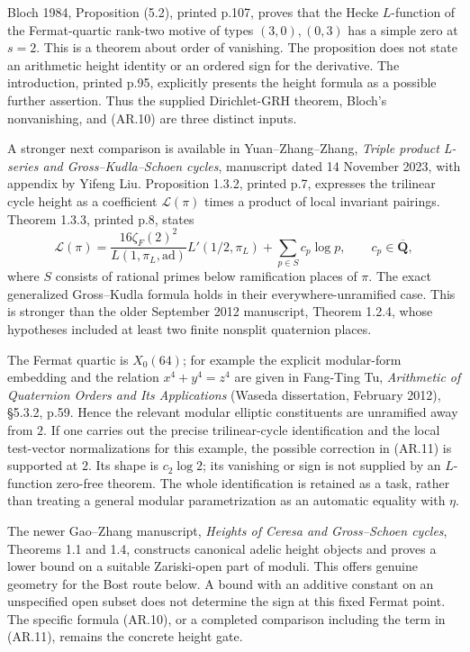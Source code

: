 Bloch 1984, Proposition (5.2), printed p.107, proves that the Hecke
\(L\)-function of the Fermat-quartic rank-two motive of types
\((3,0),(0,3)\) has a simple zero at \(s=2\). This is a theorem about
order of vanishing. The proposition does not state an arithmetic height
identity or an ordered sign for the derivative. The introduction,
printed p.95, explicitly presents the height formula as a possible
further assertion. Thus the supplied Dirichlet-GRH theorem, Bloch's
nonvanishing, and (AR.10) are three distinct inputs.

A stronger next comparison is available in Yuan--Zhang--Zhang,
\emph{Triple product L-series and Gross--Kudla--Schoen cycles},
manuscript dated 14 November 2023, with appendix by Yifeng Liu.
Proposition 1.3.2, printed p.7, expresses the trilinear cycle height as
a coefficient \(\mathcal L(\pi)\) times a product of local invariant
pairings. Theorem 1.3.3, printed p.8, states \[
\mathcal L(\pi)=
\frac{16\zeta_F(2)^2}{L(1,\pi_L,\mathrm{ad})}
 L'(1/2,\pi_L)+\sum_{p\in S}c_p\log p,
\qquad c_p\in\overline{\mathbf Q},
\tag{AR.11}
\] where \(S\) consists of rational primes below ramification places of
\(\pi\). The exact generalized Gross--Kudla formula holds in their
everywhere-unramified case. This is stronger than the older September
2012 manuscript, Theorem 1.2.4, whose hypotheses included at least two
finite nonsplit quaternion places.

The Fermat quartic is \(X_0(64)\); for example the explicit modular-form
embedding and the relation \(x^4+y^4=z^4\) are given in Fang-Ting Tu,
\emph{Arithmetic of Quaternion Orders and Its Applications} (Waseda
dissertation, February 2012), §5.3.2, p.59. Hence the relevant modular
elliptic constituents are unramified away from \(2\). If one carries out
the precise trilinear-cycle identification and the local test-vector
normalizations for this example, the possible correction in (AR.11) is
supported at \(2\). Its shape is \(c_2\log2\); its vanishing or sign is
not supplied by an \(L\)-function zero-free theorem. The whole
identification is retained as a task, rather than treating a general
modular parametrization as an automatic equality with \(\eta\).

The newer Gao--Zhang manuscript, \emph{Heights of Ceresa and
Gross--Schoen cycles}, Theorems 1.1 and 1.4, constructs canonical adelic
height objects and proves a lower bound on a suitable Zariski-open part
of moduli. This offers genuine geometry for the Bost route below. A
bound with an additive constant on an unspecified open subset does not
determine the sign at this fixed Fermat point. The specific formula
(AR.10), or a completed comparison including the term in (AR.11),
remains the concrete height gate.

